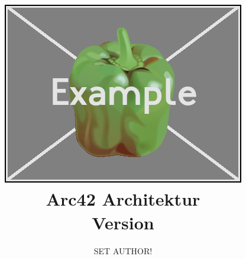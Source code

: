 


\makeglossaries





\title{\includegraphics[width=\textwidth]{../res/logo.png}\\
	Arc42 Architektur\\
	\small{Version \vhCurrentVersion}}
\author{SET AUTHOR!}
\date{\vhCurrentDate}


	\maketitle
	
	\tableofcontents
	\newpage
	
	
	
	
	
	
	
	
	
	
	
	
	
